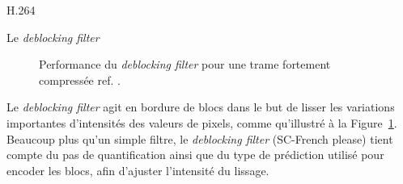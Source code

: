 \documentclass{article}
\begin{document}
\begin{section}{H.264}
\begin{subsection}{Le \textit{deblocking filter}}
\begin{figure}[htb]

\centering
{}
\caption{Performance du \textit{deblocking filter} pour une trame fortement
compressée ref. \cite{schafer2003}.}
\label{fig-Deblocking}
\end{figure}

Le \textit{deblocking filter} agit en bordure de blocs dans le but de lisser les
variations importantes d'intensités des valeurs de pixels, comme  qu'illustré
à la Figure~\ref{fig-Deblocking}. Beaucoup plus qu'un simple filtre, le
\textit{deblocking filter} (SC-French please) tient compte du pas de quantification ainsi que du
type de prédiction utilisé pour encoder les blocs, afin d'ajuster l'intensité
du lissage.


\end{subsection}
\end{section}
\end{document}
